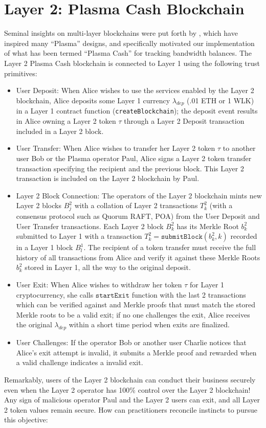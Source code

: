 \documentclass{article}
\newcommand{\block}[2]{B^{#1}_{#2}}
\newcommand{\blockhash}[2]{b^{#1}_{#2}}
\newcommand{\transaction}[2]{T_{#2}^#1}
\newcommand{\submitblock}[2]{\texttt{submitBlock}(#2, #1)}
\newcommand{\startexit}{\texttt{startExit}}
\begin{document}
\section{Layer 2: Plasma Cash Blockchain}

Seminal insights on multi-layer blockchains were put forth by \cite{poonbuterin2017}, which have inspired many ``Plasma'' designs, and specifically motivated our implementation of what has been termed ``Plasma Cash'' for tracking bandwidth balances.
The Layer 2 Plasma Cash blockchain is connected to Layer 1 using the following trust primitives:
\begin{itemize}
\item User Deposit: When Alice wishes to use the services enabled by the Layer 2 blockchain, Alice deposits some Layer 1 currency $\lambda_{dep}$ (.01 ETH or 1 WLK) in a Layer 1 contract function (\texttt{createBlockchain}); the deposit event results in Alice owning a Layer 2 token $\tau$ through a Layer 2 Deposit transaction included in a Layer 2 block.

\item User Transfer: When Alice wishes to transfer her Layer 2 token $\tau$ to another user Bob or the Plasma operator Paul, Alice signs a Layer 2 token transfer transaction specifying the recipient and the previous block.  This Layer 2 transaction is included on the Layer 2 blockchain by Paul.

\item Layer 2 Block Connection: The operators of the Layer 2 blockchain mints new Layer 2 blocks $\block{2}{j}$ with a collation of Layer 2 transactions $\transaction{2}{k}$ (with a consensus protocol such as Quorum RAFT, POA) from the User Deposit and User Transfer transactions.  Each Layer 2 block $\block{2}{k}$ has its Merkle Root $\blockhash{2}{k}$ submitted to Layer 1 with a transaction $\transaction{2}{k} = \submitblock{k}{\blockhash{2}{k}}$ recorded in a Layer 1 block $\block{1}{l}$.   The recipient of a token transfer must receive the full history of all transactions from Alice and verify it against these Merkle Roots $\blockhash{2}{k}$ stored in Layer 1, all the way to the original deposit.

\item User Exit: When Alice wishes to withdraw her token $\tau$ for Layer 1 cryptocurrency, she calls $\startexit$ function with the last 2 transactions which can be verified against and Merkle proofs that must match the stored Merkle roots to be a valid exit; if no one challenges the exit, Alice receives the original $\lambda_{dep}$ within a short time period when exits are finalized.

\item User Challenges:  If the operator Bob or another user Charlie notices that Alice's exit attempt is invalid, it submits a Merkle proof and rewarded when a valid challenge indicates a invalid exit.
\end{itemize}
Remarkably, users of the Layer 2 blockchain can conduct their business securely even when the Layer 2 operator has 100\% control over the Layer 2 blockchain!  Any sign of malicious operator Paul and the Layer 2 users can exit, and all Layer 2 token values remain secure.  How can practitioners reconcile instincts to pursue this objective:
\end{document}
